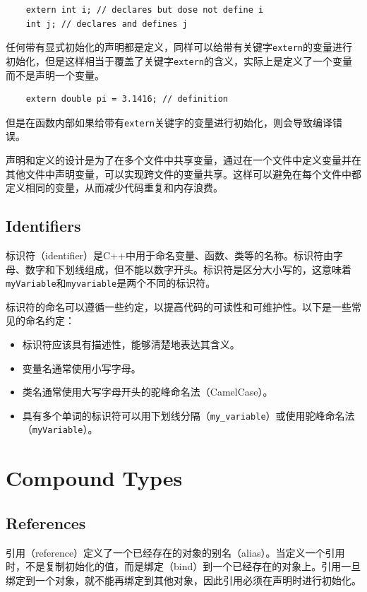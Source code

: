 \begin{verbatim}
    extern int i; // declares but dose not define i
    int j; // declares and defines j
\end{verbatim}

任何带有显式初始化的声明都是定义，同样可以给带有关键字\texttt{extern}的变量进行初始化，但是这样相当于覆盖了关键字\texttt{extern}的含义，实际上是定义了一个变量而不是声明一个变量。

\begin{verbatim}
    extern double pi = 3.1416; // definition
\end{verbatim}

但是在函数内部如果给带有\texttt{extern}关键字的变量进行初始化，则会导致编译错误。

声明和定义的设计是为了在多个文件中共享变量，通过在一个文件中定义变量并在其他文件中声明变量，可以实现跨文件的变量共享。这样可以避免在每个文件中都定义相同的变量，从而减少代码重复和内存浪费。

\subsection{Identifiers}
标识符（identifier）是C++中用于命名变量、函数、类等的名称。标识符由字母、数字和下划线组成，但不能以数字开头。标识符是区分大小写的，这意味着\texttt{myVariable}和\texttt{myvariable}是两个不同的标识符。

标识符的命名可以遵循一些约定，以提高代码的可读性和可维护性。以下是一些常见的命名约定：

\begin{itemize}
    \item 标识符应该具有描述性，能够清楚地表达其含义。
    \item 变量名通常使用小写字母。
    \item 类名通常使用大写字母开头的驼峰命名法（CamelCase）。
    \item 具有多个单词的标识符可以用下划线分隔（\texttt{my_variable}）或使用驼峰命名法（\texttt{myVariable}）。
\end{itemize}

\section{Compound Types}
\subsection{References}
引用（reference）定义了一个已经存在的对象的别名（alias）。当定义一个引用时，不是复制初始化的值，而是绑定（bind）到一个已经存在的对象上。引用一旦绑定到一个对象，就不能再绑定到其他对象，因此引用必须在声明时进行初始化。

